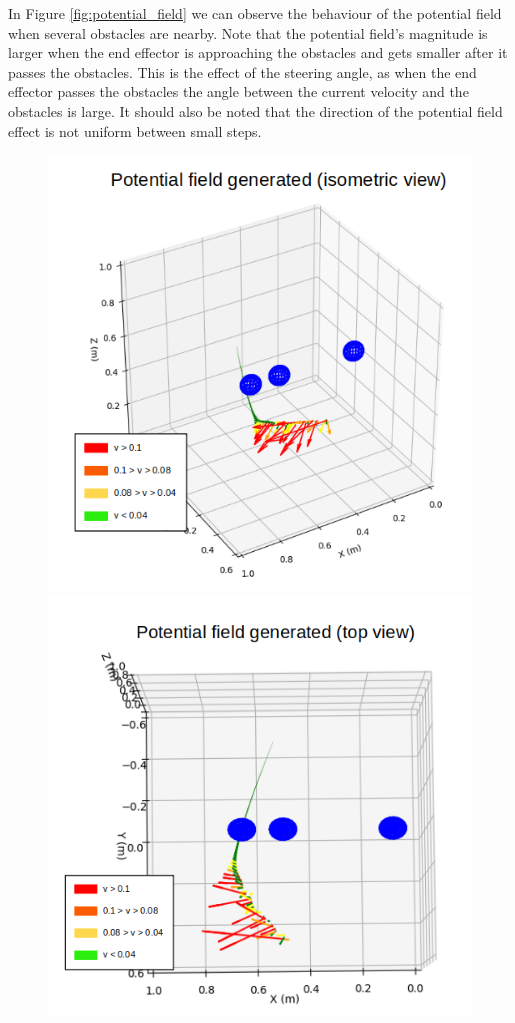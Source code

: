 \documentclass[a4paper, 10pt, conference]{ieeeconf}      %
\begin{document}
In Figure \ref{fig:potential_field} we can observe the behaviour of the potential field when several obstacles are nearby. Note that the potential field's magnitude is larger when the end effector is approaching the obstacles and gets smaller after it passes the obstacles. This is the effect of the steering angle, as when the end effector passes the obstacles the angle between the current velocity and the obstacles is large. It should also be noted that the direction of the potential field effect is not uniform between small steps.

\begin{figure}[H]
	\centering
	\includegraphics[scale=0.30]{images/potential_field.png}
	\includegraphics[scale=0.30]{images/potential_field_top.png}

\end{figure}
\end{document}
